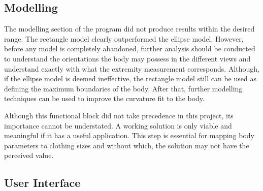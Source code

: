 \subsection{Modelling}
The modelling section of the program did not produce results within the desired range. The rectangle model clearly outperformed the ellipse model. However, before any model is completely abandoned, further analysis should be conducted to understand the orientations the body may possess in the different views and understand exactly with what the extremity measurement corresponds. Although, if the ellipse model is deemed ineffective, the rectangle model still can be used as defining the maximum boundaries of the body. After that, further modelling techniques can be used to improve the curvature fit to the body.

Although this functional block did not take precedence in this project, its importance cannot be understated. A working solution is only viable and meaningful if it has a useful application. This step is essential for mapping body parameters to clothing sizes and without which, the solution may not have the perceived value.
  
\subsection{User Interface}